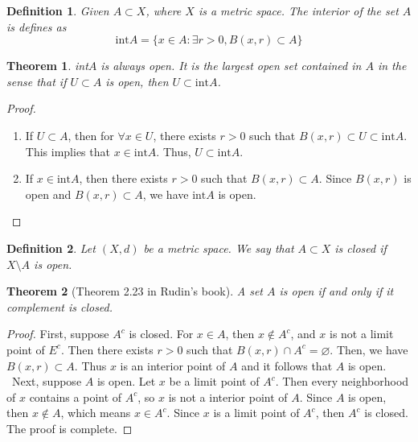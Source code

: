 \documentclass[12pt,leqno]{amsart}
\newtheorem{definition}{Definition}[section]
\newtheorem{theorem}{Theorem}[section]
\theoremstyle{definition}
\numberwithin{equation}{subsection}
\begin{document}
\medskip

\begin{definition}
Given $A\subset X$, where $X$ is a metric space. The interior of the set $A$ is defines as 
$$\text{int}A = \{x\in A: \exists r > 0, B(x,r)\subset A\}$$
\end{definition}

\medskip

\begin{theorem}
int$A$ is always open. It is the largest open set contained in $A$ in the sense that if $U\subset A$ is open, then $U \subset \text{int}A$.
\end{theorem}
\begin{proof}
~\begin{enumerate}
    \item If $U\subset A$, then for $\forall x\in U$, there exists $r>0$ such that $B(x,r)\subset U \subset \text{int}A$. This implies that $x\in \text{int}A$. Thus, $U\subset \text{int}A$.
    \item If $x\in \text{int}A$, then there exists $r>0$ such that $B(x,r)\subset A$. Since $B(x,r)$ is open and $B(x,r)\subset A$, we have $\text{int}A$ is open.
\end{enumerate}
\end{proof}

\begin{definition}
Let $(X,d)$ be a metric space. We say that $A\subset X$ is closed if $X\setminus A$ is open.
\end{definition}

\medskip

\begin{theorem}[Theorem 2.23 in Rudin's book]
A set $A$ is open if and only if it complement is closed.
\end{theorem}
\begin{proof}
First, suppose $A^c$ is closed. For $x\in A$, then $x\notin A^c$, and $x$ is not a limit point of $E^c$. Then there exists $r>0$ such that $B(x,r) \cap A^c = \varnothing$. Then, we have $B(x,r) \subset A$. Thus $x$ is an interior point of $A$ and it follows that $A$ is open.\\
\hspace*{1em}\, Next, suppose $A$ is open. Let $x$ be a limit point of $A^c$. Then every neighborhood of $x$ contains a point of $A^c$, so $x$ is not a interior point of $A$. Since $A$ is open, then $x\notin A$, which means $x\in A^c$. Since $x$ is a limit point of $A^c$, then $A^c$ is closed. The proof is complete.
\end{proof}
\end{document}

